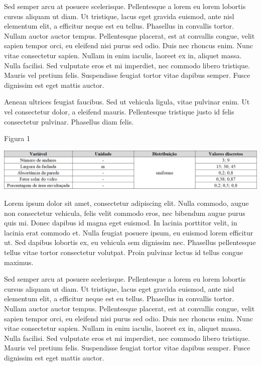 \documentclass[brazil,hardcopy,openany,a4paper]{_ufscthesis}
\begin{document}
	Sed semper arcu at posuere scelerisque. Pellentesque a lorem eu lorem lobortis cursus aliquam ut diam. Ut tristique, lacus eget gravida euismod, ante nisl elementum elit, a efficitur neque est eu tellus. Phasellus in convallis tortor. Nullam auctor auctor tempus. Pellentesque placerat, est at convallis congue, velit sapien tempor orci, eu eleifend nisi purus sed odio. Duis nec rhoncus enim. Nunc vitae consectetur sapien. Nullam in enim iaculis, laoreet ex in, aliquet massa. Nulla facilisi. Sed vulputate eros et mi imperdiet, nec commodo libero tristique. Mauris vel pretium felis. Suspendisse feugiat tortor vitae dapibus semper. Fusce dignissim est eget mattis auctor.

	Aenean ultrices feugiat faucibus. Sed ut vehicula ligula, vitae pulvinar enim. Ut vel consectetur dolor, a eleifend mauris. Pellentesque tristique justo id felis consectetur pulvinar. Phasellus diam felis.

\begin{table}[!h]
	\centering
	\caption{Figura 1}
	\includegraphics[width=1\linewidth]{img/tabelaedificacao.png}
	\label{table:tabelaedificacao}
\end{table}

	Lorem ipsum dolor sit amet, consectetur adipiscing elit. Nulla commodo, augue non consectetur vehicula, felis velit commodo eros, nec bibendum augue purus quis mi. Donec dapibus id magna eget euismod. In lacinia porttitor velit, in lacinia erat commodo et. Nulla feugiat posuere ipsum, eu euismod lorem efficitur ut. Sed dapibus lobortis ex, eu vehicula sem dignissim nec. Phasellus pellentesque tellus vitae tortor consectetur volutpat. Proin pulvinar lectus id tellus congue maximus.

Sed semper arcu at posuere scelerisque. Pellentesque a lorem eu lorem lobortis cursus aliquam ut diam. Ut tristique, lacus eget gravida euismod, ante nisl elementum elit, a efficitur neque est eu tellus. Phasellus in convallis tortor. Nullam auctor auctor tempus. Pellentesque placerat, est at convallis congue, velit sapien tempor orci, eu eleifend nisi purus sed odio. Duis nec rhoncus enim. Nunc vitae consectetur sapien. Nullam in enim iaculis, laoreet ex in, aliquet massa. Nulla facilisi. Sed vulputate eros et mi imperdiet, nec commodo libero tristique. Mauris vel pretium felis. Suspendisse feugiat tortor vitae dapibus semper. Fusce dignissim est eget mattis auctor.
\end{document}
